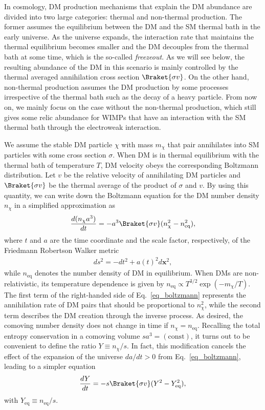 \documentclass[12pt,twoside,book]{article}
\begin{document}
In cosmology, DM production mechanisms that explain the DM abundance are divided into two large categories: thermal and non-thermal production.
The former assumes the equilibrium between the DM and the SM thermal bath in the early universe.
As the universe expands, the interaction rate that maintains the thermal equilibrium becomes smaller and the DM decouples from the thermal bath at some time, which is the so-called \textit{freezeout}.
As we will see below, the resulting abundance of the DM in this scenario is mainly controlled by the thermal averaged annihilation cross section $\Braket{\sigma v}$.
On the other hand, non-thermal production assumes the DM production by some processes irrespective of the thermal bath such as the decay of a heavy particle.
From now on, we mainly focus on the case without the non-thermal production, which still gives some relic abundance for WIMPs that have an interaction with the SM thermal bath through the electroweak interaction.

We assume the stable DM particle $\chi$ with mass $m_\chi$ that pair annihilates into SM particles with some cross section $\sigma$.
When DM is in thermal equilibrium with the thermal bath of temperature $T$, DM velocity obeys the corresponding Boltzmann distribution.
Let $v$ be the relative velocity of annihilating DM particles and $\Braket{\sigma v}$ be the thermal average of the product of $\sigma$ and $v$.
By using this quantity, we can write down the Boltzmann equation for the DM number density $n_\chi$ in a simplified approximation as
\begin{align}
  \frac{d (n_\chi a^3)}{d t} =
  - a^3 \Braket{\sigma v} (n_\chi^2 - n_{\mathrm{eq}}^2),\label{eq_boltzmann}
\end{align}
where $t$ and $a$ are the time coordinate and the scale factor, respectively, of the Friedmann Robertson Walker metric
\begin{align}
  d s^2 = - d t^2 + a(t)^2 d \bm{x}^2,
\end{align}
while $n_{\mathrm{eq}}$ denotes the number density of DM in equilibrium.
When DMs are non-relativistic, its temperature dependence is given by $n_{\mathrm{eq}} \propto T^{3/2} \exp \left( -m_\chi / T \right)$.
The first term of the right-handed side of Eq.~\eqref{eq_boltzmann} represents the annihilation rate of DM pairs that should be proportional to $n_\chi^2$, while the second term describes the DM creation through the inverse process.
As desired, the comoving number density does not change in time if $n_\chi = n_{\mathrm{eq}}$.
Recalling the total entropy conservation in a comoving volume $s a^3 = (\mathrm{const})$, it turns out to be convenient to define the ratio $Y \equiv n_\chi / s$.
In fact, this modification cancels the effect of the expansion of the universe $da / dt > 0$ from Eq.~\eqref{eq_boltzmann}, leading to a simpler equation
\begin{align}
  \frac{d Y}{d t} =
  -s \Braket{\sigma v} (Y^2 - Y_{\mathrm{eq}}^2),\label{eq_boltzmann_Yt}
\end{align}
with $Y_{\mathrm{eq}} \equiv n_{\mathrm{eq}} / s$.
\end{document}
